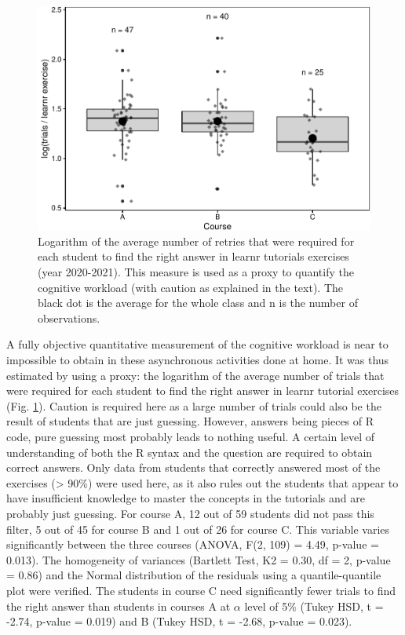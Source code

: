 \documentclass{aims}
\theoremstyle{definition}
\begin{document}
\begin{figure}
\includegraphics[width=1\linewidth]{teaching_data_science_files/figure-latex/fig_learn_trials-1} \caption{\label{fig:fig_learn_trials} Logarithm of the average number of retries that were required for each student to find the right answer in learnr tutorials exercises (year 2020-2021). This measure is used as a proxy to quantify the cognitive workload (with caution as explained in the text). The black dot is the average for the whole class and n is the number of observations.}\label{fig:fig_learn_trials}
\end{figure}

A fully objective quantitative measurement of the cognitive workload is
near to impossible to obtain in these asynchronous activities done at
home. It was thus estimated by using a proxy: the logarithm of the
average number of trials that were required for each student to find the
right answer in learnr tutorial exercises (Fig.
\ref {fig:fig_learn_trials}). Caution is required here as a large number
of trials could also be the result of students that are just guessing.
However, answers being pieces of R code, pure guessing most probably
leads to nothing useful. A certain level of understanding of both the R
syntax and the question are required to obtain correct answers. Only
data from students that correctly answered most of the exercises
(\textgreater{} 90\%) were used here, as it also rules out the students
that appear to have insufficient knowledge to master the concepts in the
tutorials and are probably just guessing. For course A, 12 out of 59
students did not pass this filter, 5 out of 45 for course B and 1 out of
26 for course C. This variable varies significantly between the three
courses (ANOVA, F(2, 109) = 4.49, p-value = 0.013). The homogeneity of
variances (Bartlett Test, K2 = 0.30, df = 2, p-value = 0.86) and the
Normal distribution of the residuals using a quantile-quantile plot were
verified. The students in course C need significantly fewer trials to
find the right answer than students in courses A at \(\alpha\) level of
5\% (Tukey HSD, t = -2.74, p-value = 0.019) and B (Tukey HSD, t = -2.68,
p-value = 0.023).
\end{document}
